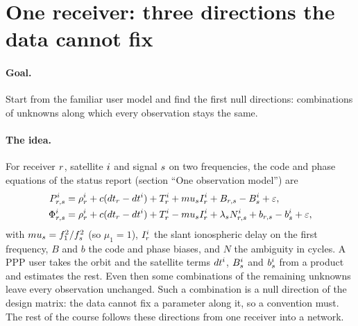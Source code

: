 
\section{One receiver: three directions the data cannot fix}\label{sec:l1}

\paragraph{Goal.} Start from the familiar user model and find the first null
directions: combinations of unknowns along which every observation stays the
same.

\paragraph{The idea.} For receiver $r$, satellite $i$ and signal $s$ on
two frequencies, the code and phase equations of the status report (section
``One observation model'') are
\begin{align}
P^i_{r,s} &= \rho^i_r + c(dt_r - dt^i)
  + T^i_r + mu_s I^i_r + B_{r,s} - B^i_s + \varepsilon,
  \label{eq:l1-code}\\
\Phi^i_{r,s} &= \rho^i_r + c(dt_r - dt^i)
  + T^i_r - mu_s I^i_r + \lambda_s N^i_{r,s}
  + b_{r,s} - b^i_s + \varepsilon,
  \label{eq:l1-phase}
\end{align}
with $mu_s = f_1^2/f_s^2$ (so $\mu_1 = 1$), $I^i_r$ the slant
ionospheric delay on the first frequency, $B$ and $b$ the code and phase biases,
and $N$ the ambiguity in cycles. A PPP user takes the orbit and the satellite
terms $dt^i$, $B^i_s$ and $b^i_s$ from a product and
estimates the rest. Even then some combinations of the remaining unknowns leave
every observation unchanged. Such a combination is a null direction of the
design matrix: the data cannot fix a parameter along it, so a convention must.
The rest of the course follows these directions from one receiver into a
network.

